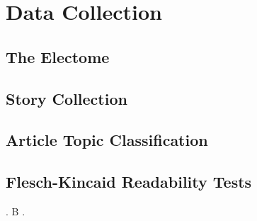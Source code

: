 \chapter{Data Collection}

\section{The Electome}
\section{Story Collection}
\section{Article Topic Classification}
\section{Flesch-Kincaid Readability Tests}
 \cite{patterson:risc,rad83}.  B 
\cite{ellis:bulldog,pet87,coutant:precision-compilers}.    
 



















